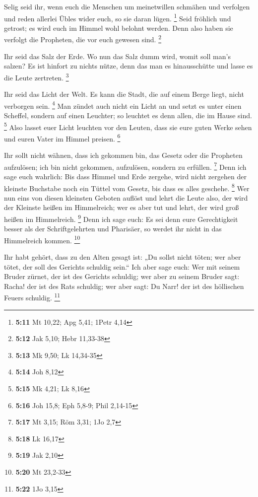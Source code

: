  Selig seid ihr, wenn euch die Menschen um meinetwillen
schmähen und verfolgen und reden allerlei Übles wider euch, so sie daran
lügen. \footnote{\textbf{5:11} Mt 10,22; Apg 5,41; 1Petr 4,14}
 Seid fröhlich und getrost; es wird euch im Himmel wohl
belohnt werden. Denn also haben sie verfolgt die Propheten, die vor euch
gewesen sind. \footnote{\textbf{5:12} Jak 5,10; Hebr 11,33-38}

 Ihr seid das Salz der Erde. Wo nun das Salz dumm wird,
womit soll man's salzen? Es ist hinfort zu nichts nütze, denn das man es
hinausschütte und lasse es die Leute zertreten. \footnote{\textbf{5:13}
  Mk 9,50; Lk 14,34-35}

 Ihr seid das Licht der Welt. Es kann die Stadt, die auf
einem Berge liegt, nicht verborgen sein. \footnote{\textbf{5:14} Joh
  8,12}  Man zündet auch nicht ein Licht an und setzt es
unter einen Scheffel, sondern auf einen Leuchter; so leuchtet es denn
allen, die im Hause sind. \footnote{\textbf{5:15} Mk 4,21; Lk 8,16}
 Also lasset euer Licht leuchten vor den Leuten, dass sie
eure guten Werke sehen und euren Vater im Himmel preisen. \footnote{\textbf{5:16}
  Joh 15,8; Eph 5,8-9; Phil 2,14-15}

 Ihr sollt nicht wähnen, dass ich gekommen bin, das Gesetz
oder die Propheten aufzulösen; ich bin nicht gekommen, aufzulösen,
sondern zu erfüllen. \footnote{\textbf{5:17} Mt 3,15; Röm 3,31; 1Jo 2,7}
 Denn ich sage euch wahrlich: Bis dass Himmel und Erde
zergehe, wird nicht zergehen der kleinste Buchstabe noch ein Tüttel vom
Gesetz, bis dass es alles geschehe. \footnote{\textbf{5:18} Lk 16,17}
 Wer nun eins von diesen kleinsten Geboten auflöst und
lehrt die Leute also, der wird der Kleinste heißen im Himmelreich; wer
es aber tut und lehrt, der wird groß heißen im Himmelreich. \footnote{\textbf{5:19}
  Jak 2,10}  Denn ich sage euch: Es sei denn eure
Gerechtigkeit besser als der Schriftgelehrten und Pharisäer, so werdet
ihr nicht in das Himmelreich kommen. \footnote{\textbf{5:20} Mt 23,2-33}

 Ihr habt gehört, dass zu den Alten gesagt ist: „Du sollst
nicht töten; wer aber tötet, der soll des Gerichts schuldig sein.``
 Ich aber sage euch: Wer mit seinem Bruder zürnet, der ist
des Gerichts schuldig; wer aber zu seinem Bruder sagt: Racha! der ist
des Rats schuldig; wer aber sagt: Du Narr! der ist des höllischen Feuers
schuldig. \footnote{\textbf{5:22} 1Jo 3,15}

